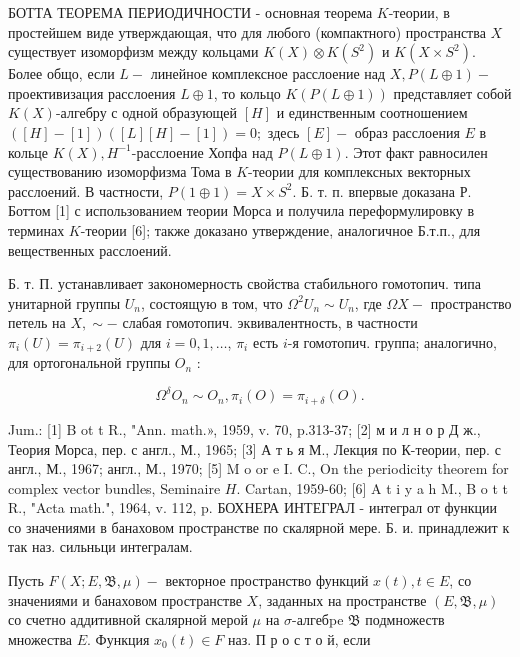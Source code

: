 \documentclass[10pt]{article}
\begin{document}
БОТТА ТЕОРЕМА ПЕРИОДИЧНОСТИ - основная теорема $K$-теории, в простейшем виде утверждающая, что для любого (компактного) пространства $X$ существует изоморфизм между кольцами $K(X) \otimes K\left(S^{2}\right)$ и $K\left(X \times S^{2}\right)$. Более общо, если $L-$ линейное комплексное расслоение над $X, P(L \oplus 1)-$ проективизация расслоения $L \oplus 1$, то кольцо $K(P(L \oplus 1))$ представляет собой $K(X)$-алгебру с одной образующей $[H]$ и единственным соотношением $([H]-[1])([L][H]-[1])=0 ;$ здесь $[E]-$ образ расслоения $E$ в кольце $K(X), H^{-1}$-расслоение Хопфа над $P(L \oplus 1)$. Этот факт равносилен существованию изоморфизма Тома в $K$-теории для комплексных векторных расслоений. В частности, $P(1 \oplus 1)=X \times S^{2}$. Б. т. п. впервые доказана Р. Боттом [1] с использованием теории Морса и получила переформулировку в терминах $K$-теории [6]; также доказано утверждение, аналогичное Б.т.п., для вещественных расслоений.



Б. т. П. устанавливает закономерность свойства стабильного гомотопич. типа унитарной группы $U_{n}$, состоящую в том, что $\Omega^{2} U_{n} \sim U_{n}$, где $\Omega X-$ пространство петель на $X, \sim-$ слабая гомотопич. эквивалентность, в частности $\pi_{i}(U)=\pi_{i+2}(U)$ для $i=0,1, \ldots$, $\pi_{i}$ есть $i$-я гомотопич. группа; аналогично, для ортогональной группы $O_{n}$ :



\[

\Omega^{\delta} O_{n} \sim O_{n}, \pi_{i}(O)=\pi_{i+\delta}(O) .

\]



Jum.: [1] B ot t R., "Ann. math.», 1959, v. 70, p.313-37; [2] м и л н о р Д ж., Теория Морса, пер. с англ., М., 1965; [3] А т ь я М., Лекция по К-теории, пер. с англ., М., 1967; англ., М., 1970; [5] M o or e I. C., On the periodicity theorem for complex vector bundles, Seminaire $H$. Cartan, 1959-60; [6] A t i y a h M., B o t t R., "Acta math.", 1964, v. 112, p. БОХНЕРА ИНТЕГРАЛ - интеграл от функции со значениями в банаховом пространстве по скалярной мере. Б. и. принадлежит к так наз. сильньци интегралам.



Пусть $F(X ; E, \mathfrak{B}, \mu)-$ векторное пространство функций $x(t), t \in E$, со значениями и банаховом пространстве $X$, заданных на пространстве $(E, \mathfrak{B}, \mu)$ со счетно аддитивной скалярной мерой $\mu$ на $\sigma$-алгебpe $\mathfrak{B}$ подмножеств множества $E$. Функция $x_{0}(t) \in F$ наз. П р о с т о й, если
\end{document}

